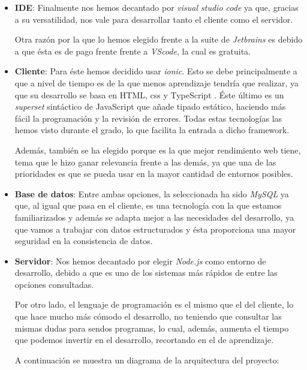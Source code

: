 \begin{itemize}
	\item \textbf{IDE}: Finalmente nos hemos decantado por \textit{visual studio code} ya que, gracias a su versatilidad, nos vale para desarrollar tanto el cliente como el servidor. 
	
	Otra razón por la que lo hemos elegido frente a la suite de \textit{Jetbrains} es debido a que ésta es de pago frente frente a \textit{VScode}, la cual es gratuita.
	
	\item \textbf{Cliente}: Para éste hemos decidido usar \textit{ionic}. Esto se debe principalmente a que a nivel de tiempo es de la que menos aprendizaje tendría que realizar, ya que su desarrollo se basa en HTML, css y TypeScript \cite{typescript}. Éste último es un \textit{superset} sintáctico de JavaScript que añade tipado estático, haciendo más fácil la programación y la revisión de errores. Todas estas tecnologías las hemos visto durante el grado, lo que facilita la entrada a dicho framework.
	
	Además, también se ha elegido porque es la que mejor rendimiento web tiene, tema que le hizo ganar relevancia frente a las demás, ya que una de las prioridades es que se pueda usar en la mayor cantidad de entornos posibles.
	
	\item \textbf{Base de datos}: Entre ambas opciones, la seleccionada ha sido \textit{MySQL} ya que, al igual que pasa en el cliente, es una tecnología con la que estamos familiarizados y además se adapta mejor a las necesidades del desarrollo, ya que vamos a trabajar con datos estructurados y ésta proporciona una mayor seguridad en la consistencia de datos.
	
	\item \textbf{Servidor}: Nos hemos decantado por elegir \textit{Node.js} como entorno de desarrollo, debido a que es uno de los sistemas más rápidos de entre las opciones consultadas.
	
	Por otro lado, el lenguaje de programación es el mismo que el del cliente, lo que hace mucho más cómodo el desarrollo, no teniendo que consultar las mismas dudas para sendos programas, lo cual, además, aumenta el tiempo que podemos invertir en el desarrollo, recortando en el de aprendizaje.
	
	A continuación se muestra un diagrama de la arquitectura del proyecto: 
\end{itemize}
